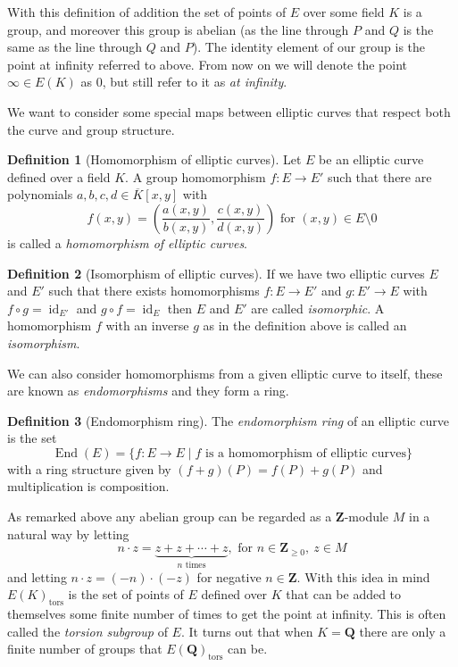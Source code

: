\documentclass[12pt,a4paper,abstracton,bibtotoc]{scrreprt}
\theoremstyle{definition}
\newtheorem{defn}{Definition}
\newcommand{\QQ}{\mathbf{Q}}
\newcommand{\ZZ}{\mathbf{Z}}
\DeclareMathOperator{\End}{End}
\DeclareMathOperator{\id}{id}
\begin{document}
With this definition of addition the set of points of $E$ over some field $K$ is a group, and moreover this group is abelian (as the line through $P$ and $Q$ is the same as the line through $Q$ and $P$).
The identity element of our group is the point at infinity referred to above.
From now on we will denote the point $\infty\in E(K)$ as $0$, but still refer to it as \emph{at infinity}.

We want to consider some special maps between elliptic curves that respect both the curve and group structure.
\begin{defn}[Homomorphism of elliptic curves]
Let $E$ be an elliptic curve defined over a field $K$.
A group homomorphism $f\colon E \to E'$ such that there are polynomials $a,b,c,d\in \overline{K}[x,y]$ with
\[
f(x,y) = \left(\frac{a(x,y)}{b(x,y)},\frac{c(x,y)}{d(x,y)}\right) \text{ for } (x,y) \in E\setminus 0
\]
is called a \emph{homomorphism of elliptic curves}.
\end{defn}

\begin{defn}[Isomorphism of elliptic curves]
If we have two elliptic curves $E$ and $E'$ such that there exists homomorphisms $f\colon E \to E'$ and $g\colon E'\to E$ with $f\circ g = \id_{E'}$ and $g\circ f = \id_{E}$ then $E$ and $E'$ are called \emph{isomorphic}.
A homomorphism $f$ with an inverse $g$ as in the definition above is called an \emph{isomorphism}.
\end{defn}

We can also consider homomorphisms from a given elliptic curve to itself, these are known as \emph{endomorphisms} and they form a ring.

\begin{defn}[Endomorphism ring]
The \emph{endomorphism ring} of an elliptic curve is the set
\[
\End(E) = \{f\colon E \to E\mid f \text{ is a homomorphism of elliptic curves}\}
\]
with a ring structure given by $(f+g)(P) = f(P) + g(P)$ and multiplication is composition.
\end{defn}

As remarked above any abelian group can be regarded as a $\ZZ$-module $M$ in a natural way by letting 
\[n\cdot z = \underbrace{z + z + \cdots + z}_\text{$n$ times},\text{ for } n\in\ZZ_{\ge 0},\ z\in M\]
and letting $n\cdot z = (-n)\cdot(-z)$ for negative $n\in \ZZ$.
With this idea in mind $E(K)_\text{tors}$ is the set of points of $E$ defined over $K$ that can be added to themselves some finite number of times to get the point at infinity.
This is often called the \emph{torsion subgroup} of $E$.
It turns out that when $K = \QQ$ there are only a finite number of groups that $E(\QQ)_\text{tors}$ can be.
\end{document}
